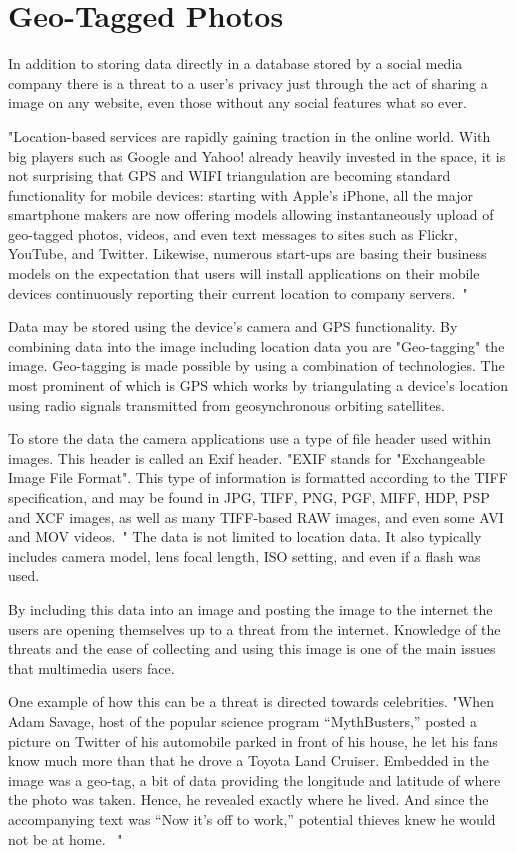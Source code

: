 \section{Geo-Tagged Photos}
In addition to storing data directly in a database stored by a social media
company there is a threat to a user's privacy just through the act of sharing a
image on any website, even those without any social features what so ever.

"Location-based services are rapidly gaining traction in the online world. With
big players such as Google and Yahoo! already heavily invested in the space, it
is not surprising that GPS and WIFI triangulation are becoming standard
functionality for mobile devices: starting with Apple’s iPhone, all the major
smartphone makers are now offering models allowing instantaneously upload of
geo-tagged photos, videos, and even text messages to sites such as Flickr,
YouTube, and Twitter. Likewise, numerous start-ups are basing their business
models on the expectation that users will install applications on their mobile
devices continuously reporting their current location to company
servers.~\cite{friedlcybercasing}"

Data may be stored using the device's camera and GPS functionality. By
combining data into the image including location data you are "Geo-tagging" the
image. Geo-tagging is made possible by using a combination of technologies. The
most prominent of which is GPS which works by triangulating a device's location
using radio signals transmitted from geosynchronous orbiting satellites. 

To store the data the camera applications use a type of file header used within
images. This header is called an Exif header. "EXIF stands for "Exchangeable
Image File Format". This type of information is formatted according to the TIFF
specification, and may be found in JPG, TIFF, PNG, PGF, MIFF, HDP, PSP and XCF
images, as well as many TIFF-based RAW images, and even some AVI and MOV
videos.~\cite{exif}" The data is not limited to location data. It also typically
includes camera model, lens focal length, ISO setting, and even if a flash was
used. 

By including this data into an image and posting the image to the internet the
users are opening themselves up to a threat from the internet. Knowledge of the
threats and the ease of collecting and using this image is one of the main issues
that multimedia users face.

One example of how this can be a threat is directed towards celebrities. "When
Adam Savage, host of the popular science program “MythBusters,” posted a picture
on Twitter of his automobile parked in front of his house, he let his fans know
much more than that he drove a Toyota Land Cruiser. Embedded in the image was a
geo-tag, a bit of data providing the longitude and latitude of where the photo
was taken. Hence, he revealed exactly where he lived. And since the accompanying
text was “Now it’s off to work,” potential thieves knew he would not be at home.
~\cite{geotagnyt}"

